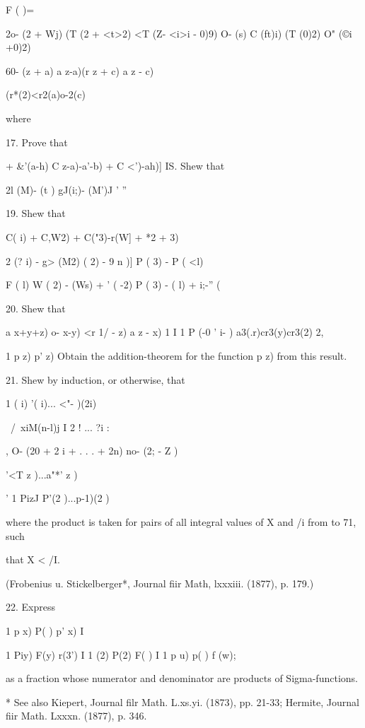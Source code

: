 {F ( )=

2o- (2 + Wj) (T (2 + <t>2) <T (Z- <i>i - 0)9) O- (s) C (ft)i) (T (0)2)
O" (©i +0)2)

60- (z + a) a z-a)(r z + c) a z - c)

(r*(2)<r2(a)o-2(c)

where

17. Prove that

+ \&'(a-h) C z-a)-a'-b) + C <')-ah)] IS. Shew that



2l (M)- (t ) gJ(i;)- (M')J ' ''


19. Shew that

C( i) + C,W2) + C("3)-r(W] + *2 + 3)

2 (? i) - g> (M2) ( 2) - 9 n )] P ( 3) - P ( <l)

F ( l) W ( 2) - (Ws) + ' ( -2) P ( 3) - ( l) + i;-'' (%


20. Shew that

a x+y+z) o- x-y) <r 1/ - z) a z - x) 1 I 1 P (-0 ' i- )
a3(.r)cr3(y)cr3(2) 2,

1 p z) p' z) Obtain the addition-theorem for the function p z) from
this result.

21. Shew by induction, or otherwise, that

1 ( i) '( i)... <"- )(2i)

\ /\ xiM(n-l)j I 2 ! ... ?i :

, O- (20 + 2 i + . . . + 2n) no- (2; - Z )

'<T z )...a"*' z )

' 1 PizJ P'(2 )...p-1)(2 )

where the product is taken for pairs of all integral values of X and
/i from to 71, such

that X < /I.

(Frobenius u. Stickelberger*, Journal fiir Math, lxxxiii. (1877), p.
179.)

22. Express

1 p x) P( ) p' x) I

1 Piy) F(y) r(3') I 1 (2) P(2) F( ) I 1 p u) p( ) f (w);

as a fraction whose numerator and denominator are products of
Sigma-functions.

* See also Kiepert, Journal filr Math. L.xs.yi. (1873), pp. 21-33;
Hermite, Journal fiir Math. Lxxxn. (1877), p. 346.

}
